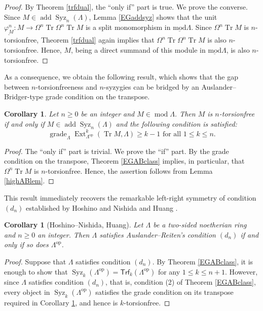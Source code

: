 \documentclass{amsart}
\newtheorem{cor}[thm]{Corollary}
\theoremstyle{definition}
\theoremstyle{remark}
\numberwithin{equation}{thm}
\def\add{\operatorname{add}}
\def\Ext{\operatorname{Ext}}
\def\ge{\geqslant}
\def\grade{\operatorname{grade}}
\def\le{\leqslant}
\def\lmod{\operatorname{\underline{mod}}}
\def\mod{\operatorname{mod}}
\def\syz{\Omega}
\def\Syz{\operatorname{Syz}}
\def\Trf{\mathsf{Trf}}
\def\tr{\operatorname{Tr}}
\begin{document}
\begin{proof}
By Theorem \ref{trfdual}, the ``only if'' part is true. We prove the converse. Since $M\in\add\Syz_n(\Lambda)$, Lemma \ref{EGaddsyz} shows that the unit $\underline{\varphi^n_M}:M\to\syz^n\tr\syz^n\tr M$ is a split monomorphism in $\lmod\Lambda$. Since $\syz^n\tr M$ is $n$-torsionfree, Theorem \ref{trfdual} again implies that $\syz^n\tr\syz^n\tr M$ is also $n$-torsionfree. Hence, $M$, being a direct summand of this module in $\lmod\Lambda$, is also $n$-torsionfree.
\end{proof}

As a consequence, we obtain the following result, which shows that the gap between $n$-torsionfreeness and $n$-syzygies can be bridged by an Auslander--Bridger-type grade condition on the transpose.

\begin{cor}\label{EGhighAB}
Let $n\ge0$ be an integer and $M\in\mod\Lambda$.
Then $M$ is $n$-torsionfree if and only if $M\in\add\Syz_n(\Lambda)$ and the following condition is satisfied:
$$
\grade_{\Lambda}\Ext^k_{\Lambda^{\mathrm{op}}}(\tr M,\Lambda)\ge k-1\text{ for all }1\le k\le n.
$$
\end{cor}

\begin{proof}
The ``only if'' part is trivial. We prove the ``if'' part. By the grade condition on the transpose, Theorem \ref{EGABclass} implies, in particular, that $\syz^n\tr M$ is $n$-torsionfree. Hence, the assertion follows from Lemma \ref{highABlem}.
\end{proof}

This result immediately recovers the remarkable left-right symmetry of condition $(d_n)$ established by Hoshino and Nishida \cite[Theorem 4.6]{HN} and Huang \cite[Theorem 2.4]{Hu08}.

\begin{cor}[Hoshino--Nishida, Huang]\label{symm}
Let $\Lambda$ be a two-sided noetherian ring and $n\ge0$ an integer. Then $\Lambda$ satisfies Auslander--Reiten's condition $(d_n)$ if and only if so does $\Lambda^{\mathrm{op}}$.
\end{cor}

\begin{proof}
Suppose that $\Lambda$ satisfies condition $(d_n)$. By Theorem \ref{EGABclass}, it is enough to show that $\Syz_k(\Lambda^{\mathrm{op}})=\Trf_k(\Lambda^{\mathrm{op}})$ for any $1\le k\le n+1$. However, since $\Lambda$ satisfies condition $(d_n)$, that is, condition (2) of Theorem \ref{EGABclass}, every object in $\Syz_k(\Lambda^{\mathrm{op}})$ satisfies the grade condition on its transpose required in Corollary \ref{EGhighAB}, and hence is $k$-torsionfree.
\end{proof}
\end{document}
